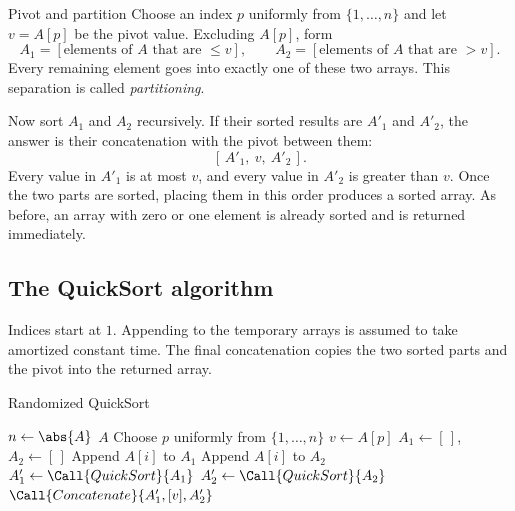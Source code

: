 \documentclass[a4paper,12pt,oneside]{report}
\begin{document}
\begin{frameddefn}{Pivot and partition}\label{def:quicksort-pivot}
Choose an index $p$ uniformly from $\{1,\ldots,n\}$ and let $v=A[p]$
be the pivot value. Excluding $A[p]$, form
\[
  A_1=[\text{elements of }A\text{ that are }\leq v],\qquad
  A_2=[\text{elements of }A\text{ that are }>v].
\]
Every remaining element goes into exactly one of these two arrays.
This separation is called \emph{partitioning}.
\end{frameddefn}

Now sort $A_1$ and $A_2$ recursively. If their sorted results are
$A'_1$ and $A'_2$, the answer is their concatenation with the pivot
between them:
\[
  [\,A'_1,\ v,\ A'_2\,].
\]
Every value in $A'_1$ is at most $v$, and every value in $A'_2$ is
greater than $v$. Once the two parts are sorted, placing them in this
order produces a sorted array. As before, an array with zero or one
element is already sorted and is returned immediately.

\subsection{The QuickSort algorithm}

Indices start at $1$. Appending to the temporary arrays is assumed
to take amortized constant time. The final concatenation copies the
two sorted parts and the pivot into the returned array.

\begin{framedalgo}{Randomized QuickSort}\label{alg:randomized-quicksort}
\begin{algorithmic}[1]
    \State $n\gets\abs{A}$ 
      \State \Return $A$
    \EndIf
    \State Choose $p$ uniformly from $\{1,\ldots,n\}$
    \State $v\gets A[p]$
    \State $A_1\gets[\,]$, $A_2\gets[\,]$
     
          \State Append $A[i]$ to $A_1$
        \Else
          \State Append $A[i]$ to $A_2$
        \EndIf
      \EndIf
    \EndFor
    \State $A'_1\gets\Call{QuickSort}{A_1}$ 
    \State $A'_2\gets\Call{QuickSort}{A_2}$ 
    \State \Return $\Call{Concatenate}{A'_1,[v],A'_2}$ 
  \EndFunction
\end{algorithmic}
\end{framedalgo}
\end{document}
